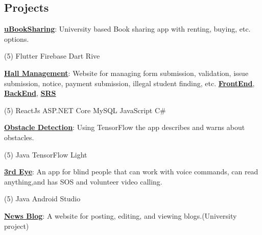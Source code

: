 \documentclass[mm]{simple_style}
\let\oldhref\href
\renewcommand{\href}[2]{\oldhref{#1}{\bfseries#2}}
\begin{document}
\begin{resume}
\section{Projects}
{\href{https://github.com/Sourav9063/uBookSharing}{uBookSharing}}: University based Book sharing app with renting, buying, etc. options.\\
\vspace{-4mm}
\begin{tasks}[style=itemize ,label=\textcolor{gray}{$\bullet$}](5)
\task Flutter
\task Firebase
\task Dart
\task Rive
\end{tasks}
\vspace{-2mm}
\href{https://sourav9063.github.io/hall_management_rf/}{Hall Management}: Website for managing form submission, validation, issue submission, notice, payment submission, illegal student finding, etc. \href{https://github.com/Sourav9063/hall_management_rf}{FrontEnd}, \href{https://github.com/Sourav9063/Backend_hall_management}{BackEnd},
\href{https://docs.google.com/document/d/1Sy9VO97rWJrOYCMgWRGJz4H2q3vJPSVCpLRm5AUOsO8/edit?usp=sharing}{SRS}\\
\vspace{-4mm}
\begin{tasks}[style=itemize ,label=\textcolor{gray}{$\bullet$}](5)
\task ReactJs 
\task ASP.NET Core
\task MySQL 
\task JavaScript
\task  C{\lserif\#}
\end{tasks}
\vspace{-2mm}
\href{https://github.com/Sourav9063/obstacles_detection}{Obstacle Detection}: Using TensorFlow the app describes and warns about obstacles.\\
\vspace{-4mm}
\begin{tasks}[style=itemize ,label=\textcolor{gray}{$\bullet$}](5)
\task Java
\task TensorFlow Light
\end{tasks}
\vspace{-2mm}
\href{https://github.com/Sourav9063/3rdEye}{3rd Eye}: An app for blind people that can work with voice commands, can read anything,and has SOS and volunteer video calling.
\vspace{-4mm}
\begin{tasks}[style=itemize ,label=\textcolor{gray}{$\bullet$}](5)
\task[] \hspace
\task[] \hspace
\task Java
\task Android Studio
\end{tasks}
\vspace{-2mm}
\href{https://github.com/Sourav9063/Blog-CRUD-by-Nodejs}{News Blog}: A website for posting, editing, and viewing blogs.(University project)\\

\end{resume}
\end{document}

